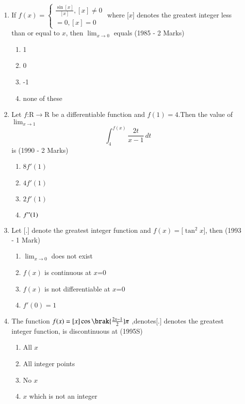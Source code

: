 \documentclass[journal,12pt,twocolumn]{IEEEtran}
\theoremstyle{remark}
\begin{document}
\begin{enumerate}[start=2]
\begin{enumerate}
                 \end{enumerate}

\item If $f(x)=\begin{cases}
    \frac{\sin[x]}{[x]}, [x]\neq 0\\ =0 ,  [x]=0\end{cases}$   where [$x$] denotes the greatest integer less than or equal to $x$, then $\lim_{x\to 0}$ equals
    \hfill                (1985 - 2 Marks)
    \begin{enumerate}
        \item 1
        \item 0
        \item -1
        \item none of these
    \end{enumerate}

\item Let $f$:R$\to$R be a differentiable function and $f(1)=4$.Then the value of $\lim_{x\to 1}$\[ \int_{4}^{f(x)}\frac{2t}{x-1}\,dt\]  is
\hfill(1990 - 2 Marks)
 \begin{enumerate}
     \item 8$f'(1)$
     \item $4f'(1)$
     \item $2f'(1)$
     \item $f"(1)$
     
     
 \end{enumerate}

\item Let [.] denote the greatest integer function and $f(x)=[\tan^2{x}$], then
\hfill(1993 - 1 Mark)
    \begin{enumerate}
        \item $\lim_{x\to 0}$ does not exist
        \item $f(x)$ is continuous at $x$=0
        \item $f(x)$ is not differentiable at $x$=0
        \item $f'(0)=1$
        
    \end{enumerate}

\item The function $f(x)=[x]\cos{\brak{\frac{2x-1}{2}}}\pi$ ,denotes[.] denotes the greatest integer function, is discontinuous at
\hfill(1995S)
   \begin{enumerate}
       \item All $x$
       \item All integer points
       \item No $x$
       \item $x$ which is not an integer
   \end{enumerate}


\end{enumerate}
\end{document}
